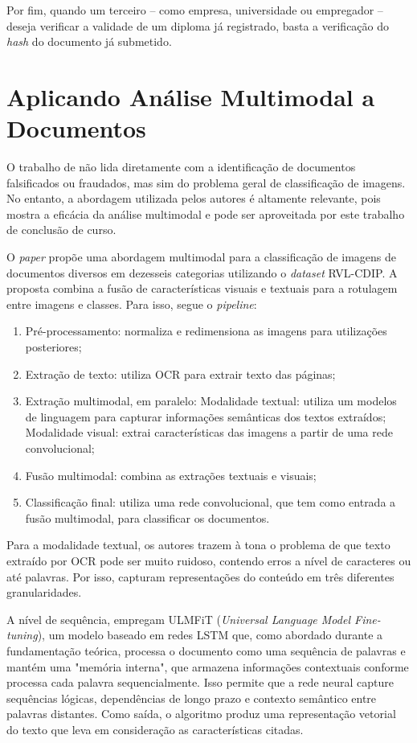 Por fim, quando um terceiro -- como empresa, universidade ou empregador -- deseja verificar a validade de um diploma já registrado, basta a verificação do \textit{hash} do documento já submetido.

\section{Aplicando Análise Multimodal a Documentos}

O trabalho de \citeauthor*{multimodal} \cite*{multimodal} não lida diretamente com a identificação de documentos falsificados ou fraudados, mas sim do problema geral de classificação de imagens. No entanto, a abordagem utilizada pelos autores é altamente relevante, pois mostra a eficácia da análise multimodal e pode ser aproveitada por este trabalho de conclusão de curso.

O \textit{paper} propõe uma abordagem multimodal para a classificação de imagens de documentos diversos em dezesseis categorias utilizando o \textit{dataset} RVL-CDIP. A proposta combina a fusão de características visuais e textuais para a rotulagem entre imagens e classes. Para isso, segue o \textit{pipeline}:

\begin{enumerate}
    \item Pré-processamento: normaliza e redimensiona as imagens para utilizações posteriores;
    \item Extração de texto: utiliza OCR para extrair texto das páginas;
    \item Extração multimodal, em paralelo:
    \subitem Modalidade textual: utiliza um modelos de linguagem para capturar informações semânticas dos textos extraídos;
    \subitem Modalidade visual: extrai características das imagens a partir de uma rede convolucional;
    \item Fusão multimodal: combina as extrações textuais e visuais;
    \item Classificação final: utiliza uma rede convolucional, que tem como entrada a fusão multimodal, para classificar os documentos.
\end{enumerate}

Para a modalidade textual, os autores trazem à tona o problema de que texto extraído por OCR pode ser muito ruidoso, contendo erros a nível de caracteres ou até palavras. Por isso, capturam representações do conteúdo em três diferentes granularidades. 

A nível de sequência, empregam ULMFiT (\textit{Universal Language Model Fine-tuning}), um modelo baseado em redes LSTM que, como abordado durante a fundamentação teórica, processa o documento como uma sequência de palavras e mantém uma "memória interna", que armazena informações contextuais conforme processa cada palavra sequencialmente. Isso permite que a rede neural capture sequências lógicas, dependências de longo prazo e contexto semântico entre palavras distantes. Como saída, o algoritmo produz uma representação vetorial do texto que leva em consideração as características citadas.

